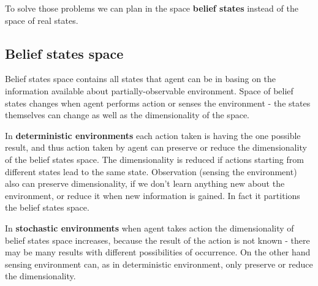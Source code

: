 \documentclass[a4paper,10pt]{article}
\begin{document}
To solve those problems we can plan in the space \textbf{belief states} instead of the space of real states.

\subsection{Belief states space}

Belief states space contains all states that agent can be in basing on the information available about partially-observable environment. Space of belief states changes when agent performs action or senses the environment - the states themselves can change as well as the dimensionality of the space.

In \textbf{deterministic environments} each action taken is having the one possible result, and thus action taken by agent can preserve or reduce the dimensionality of the belief states space. The dimensionality is reduced if actions starting from different states lead to the same state. Observation (sensing the environment) also can preserve dimensionality, if we don't learn anything new about the environment, or reduce it when new information is gained. In fact it partitions the belief states space.

In \textbf{stochastic environments} when agent takes action the dimensionality of belief states space increases, because the result of the action is not known - there may be many results with different possibilities of occurrence. On the other hand sensing environment can, as in deterministic environment, only preserve or reduce the dimensionality.
\end{document}

